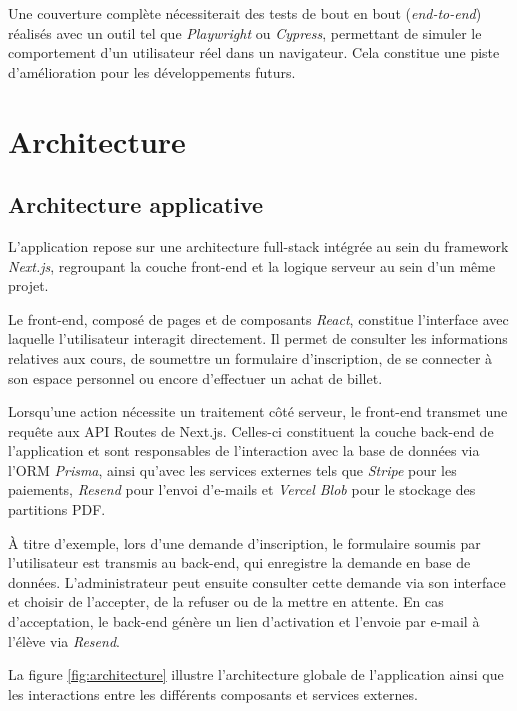 \documentclass{article}
\begin{document}
Une couverture complète nécessiterait des tests de bout en bout 
(\textit{end-to-end}) réalisés avec un outil tel que \textit{Playwright} 
ou \textit{Cypress}, permettant de simuler le comportement d'un 
utilisateur réel dans un navigateur. Cela constitue une piste 
d'amélioration pour les développements futurs.

\section{Architecture}

\subsection{Architecture applicative}

L'application repose sur une architecture full-stack intégrée au sein du 
framework \textit{Next.js}, regroupant la couche front-end et la logique 
serveur au sein d'un même projet.

Le front-end, composé de pages et de composants \textit{React}, constitue 
l'interface avec laquelle l'utilisateur interagit directement. Il permet 
de consulter les informations relatives aux cours, de soumettre un formulaire 
d'inscription, de se connecter à son espace personnel ou encore d'effectuer 
un achat de billet.

Lorsqu'une action nécessite un traitement côté serveur, le front-end 
transmet une requête aux API Routes de Next.js. Celles-ci constituent 
la couche back-end de l'application et sont responsables de l'interaction 
avec la base de données via l'ORM \textit{Prisma}, ainsi qu'avec les 
services externes tels que \textit{Stripe} pour les paiements, 
\textit{Resend} pour l'envoi d'e-mails et \textit{Vercel Blob} pour 
le stockage des partitions PDF.

À titre d'exemple, lors d'une demande d'inscription, le formulaire soumis 
par l'utilisateur est transmis au back-end, qui enregistre la demande en 
base de données. L'administrateur peut ensuite consulter cette demande via 
son interface et choisir de l'accepter, de la refuser ou de la mettre en 
attente. En cas d'acceptation, le back-end génère un lien d'activation et 
l'envoie par e-mail à l'élève via \textit{Resend}.

La figure \ref{fig:architecture} illustre l'architecture globale de 
l'application ainsi que les interactions entre les différents composants 
et services externes.
\end{document}
